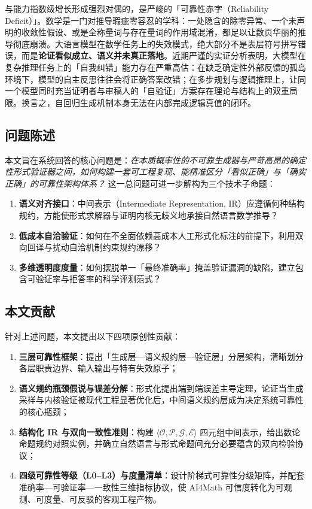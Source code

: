 ﻿\documentclass[UTF8,a4paper,11pt]{ctexart}
\theoremstyle{definition}
\begin{document}
与能力指数级增长形成强烈对偶的，是严峻的「可靠性赤字（Reliability Deficit）」。数学是一门对推导瑕疵零容忍的学科：一处隐含的除零异常、一个未声明的收敛性假设、或是全称量词与存在量词的作用域混淆，都足以让数页华丽的推导彻底崩溃。大语言模型在数学任务上的失效模式，绝大部分不是表层符号拼写错误，而是\textbf{论证看似成立、语义并未真正落地}。近期严谨的实证分析表明，大模型在复杂推理任务上的「自我纠错」能力存在严重高估：在缺乏确定性外部反馈的孤岛环境下，模型的自主反思往往会将正确答案改错\cite{huang2023selfcorrect}；在多步规划与逻辑推理上，让同一个模型同时充当证明者与审稿人的「自验证」方案存在理论与结构上的双重局限\cite{stechly2024selfverif}。换言之，自回归生成机制本身无法在内部完成逻辑真值的闭环。

\subsection{问题陈述}
本文旨在系统回答的核心问题是：\emph{在本质概率性的不可靠生成器与严苛高昂的确定性形式验证器之间，如何构建一套可工程复现、能精准区分「看似正确」与「确实正确」的可靠性架构体系？} 这一总问题可进一步解构为三个技术子命题：
\begin{enumerate}[leftmargin=1.8em,itemsep=2pt]
  \item \textbf{语义对齐接口}：中间表示（Intermediate Representation, IR）应遵循何种结构规约，方能使形式求解器与证明内核无歧义地承接自然语言数学推导？
  \item \textbf{低成本自洽验证}：如何在不全面依赖高成本人工形式化标注的前提下，利用双向回译与扰动自洽机制约束规约漂移？
  \item \textbf{多维透明度度量}：如何摆脱单一「最终准确率」掩盖验证漏洞的缺陷，建立包含可验证率与拒答率的科学评测范式？
\end{enumerate}

\subsection{本文贡献}
针对上述问题，本文提出以下四项原创性贡献：
\begin{enumerate}[leftmargin=1.8em,itemsep=2pt]
  \item \textbf{三层可靠性框架}：提出「生成层—语义规约层—验证层」分层架构，清晰划分各层职责边界、输入输出与特有失效原子；
  \item \textbf{语义规约瓶颈假说与误差分解}：形式化提出端到端误差主导定理，论证当生成采样与内核验证被现代工程显著优化后，中间语义规约层成为决定系统可靠性的核心瓶颈；
  \item \textbf{结构化 IR 与双向一致性准则}：构建 $\langle \mathcal{O}, \mathcal{P}, \mathcal{G}, \mathcal{E} \rangle$ 四元组中间表示，给出数论命题规约对照实例，并确立自然语言与形式命题间充分必要蕴含的双向检验协议；
  \item \textbf{四级可靠性等级（L0--L3）与度量清单}：设计阶梯式可靠性分级矩阵，并配套准确率—可验证率—一致性三维指标协议，使 AI4Math 可信度转化为可观测、可度量、可反驳的客观工程产物。
\end{enumerate}
\end{document}
